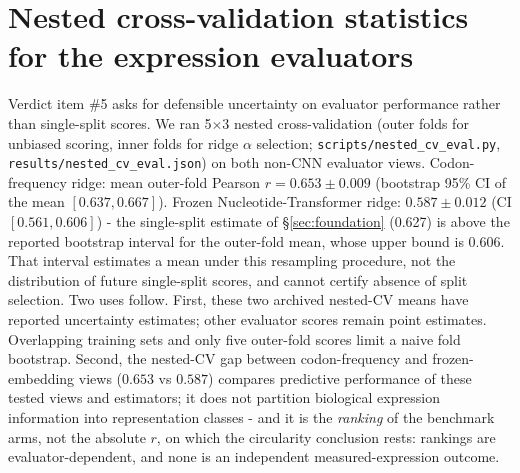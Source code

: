 \documentclass[11pt]{article}
\begin{document}
\section{Nested cross-validation statistics for the expression evaluators}
\label{sec:nestedcv}
Verdict item \#5 asks for defensible uncertainty on evaluator performance rather
than single-split scores. We ran 5$\times$3 nested cross-validation (outer folds
for unbiased scoring, inner folds for ridge $\alpha$ selection;
\texttt{scripts/nested\_cv\_eval.py}, \texttt{results/nested\_cv\_eval.json}) on
both non-CNN evaluator views. Codon-frequency ridge: mean outer-fold Pearson
$r = 0.653 \pm 0.009$ (bootstrap 95\% CI of the mean $[0.637, 0.667]$). Frozen
Nucleotide-Transformer ridge: $0.587 \pm 0.012$ (CI $[0.561, 0.606]$) - the single-split estimate of \S\ref{sec:foundation} (0.627) is above the reported bootstrap interval for the outer-fold mean, whose upper bound is 0.606. That interval estimates a mean under this resampling procedure, not the distribution of future single-split scores, and cannot certify absence of split selection. Two uses follow. First, these two archived nested-CV means have reported uncertainty estimates; other evaluator scores remain point estimates. Overlapping training sets and only five outer-fold scores limit a naive fold bootstrap. Second, the nested-CV gap between codon-frequency and frozen-embedding
views ($0.653$ vs $0.587$) compares predictive performance of these tested views and estimators; it does not partition biological expression information into representation classes - and it is the \emph{ranking} of the benchmark arms, not
the absolute $r$, on which the circularity conclusion rests: rankings are evaluator-dependent, and none is an independent measured-expression outcome.



\end{document}
